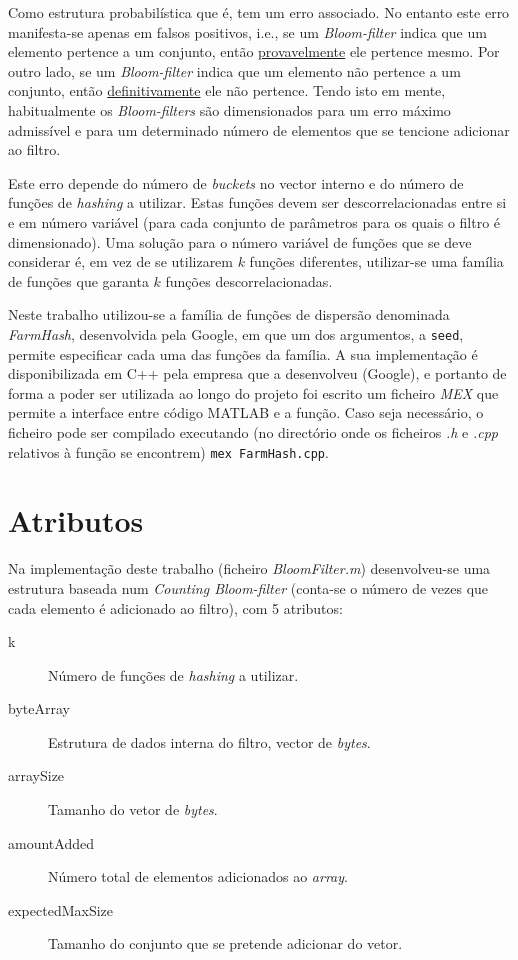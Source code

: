 \documentclass[a4paper,11pt,openright,oneside]{report}
\begin{document}
Como estrutura probabilística que é, tem um erro associado. No entanto este erro manifesta-se apenas em falsos positivos, i.e., se um \textit{Bloom-filter} indica que um elemento pertence a um conjunto, então \underline{provavelmente} ele pertence mesmo. Por outro lado, se um \textit{Bloom-filter} indica que um elemento não pertence a um conjunto, então \underline{definitivamente} ele não pertence. Tendo isto em mente, habitualmente os \textit{Bloom-filters} são dimensionados para um erro máximo admissível e para um determinado número de elementos que se tencione adicionar ao filtro.

Este erro depende do número de \textit{buckets} no vector interno e do número de funções de \textit{hashing} a utilizar. Estas funções devem ser descorrelacionadas entre si e em número variável (para cada conjunto de parâmetros para os quais o filtro é dimensionado). Uma solução para o número variável de funções que se deve considerar é, em vez de se utilizarem $k$ funções diferentes, utilizar-se uma família de funções que garanta $k$ funções descorrelacionadas.

Neste trabalho utilizou-se a família de funções de dispersão denominada \textit{FarmHash}, desenvolvida pela Google, em que um dos argumentos, a \texttt{seed}, permite especificar cada uma das funções da família. A sua implementação é disponibilizada em C++ pela empresa que a desenvolveu (Google), e portanto de forma a poder ser utilizada ao longo do projeto foi escrito um ficheiro \textit{MEX} que permite a interface entre código MATLAB e a função. Caso seja necessário, o ficheiro pode ser compilado executando (no directório onde os ficheiros \textit{.h} e \textit{.cpp} relativos à função se encontrem) \verb|mex FarmHash.cpp|.

\section{Atributos}

Na implementação deste trabalho (ficheiro \textit{BloomFilter.m}) desenvolveu-se uma estrutura baseada num \textit{Counting Bloom-filter} (conta-se o número de vezes que cada elemento é adicionado ao filtro), com 5 atributos:

\begin{description}
\item[k]
Número de funções de \textit{hashing} a utilizar.
\item[byteArray]
Estrutura de dados interna do filtro, vector de \textit{bytes}.
\item[arraySize]
Tamanho do vetor de \textit{bytes}.
\item[amountAdded]
Número total de elementos adicionados ao \textit{array}.
\item[expectedMaxSize]
Tamanho do conjunto que se pretende adicionar do vetor.
\end{description}
\end{document}

